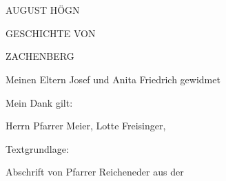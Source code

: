





























AUGUST HÖGN



GESCHICHTE VON

ZACHENBERG



Meinen Eltern Josef und Anita Friedrich gewidmet

































































Mein Dank gilt:

Herrn Pfarrer Meier, Lotte Freisinger,



Textgrundlage:

Abschrift von Pfarrer Reicheneder aus der

